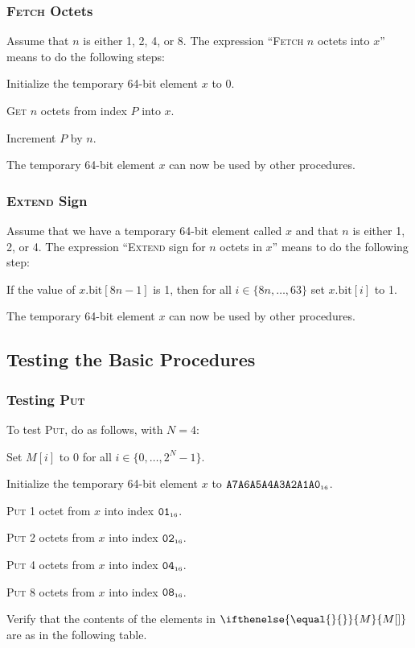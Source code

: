 \documentclass[a4paper,12pt]{article}
\newcommand{\num}[1]{\texttt{#1}}
\newcommand{\hex}[1]{\num{#1}_{\textup{\tiny 16}}}
\newcommand{\MEM}[1]{\ifthenelse{\equal{#1}{}}{M}{M[#1]}}
\newcommand{\PC}{P}
\newcommand{\bitno}[2]{#1.\mathrm{bit}[#2]}
\newcommand{\range}[2]{\{#1,\ldots,#2\}}
\newcommand{\proc}[1]{\textsc{#1}}
\begin{document}
\subsubsection{\proc{Fetch} Octets}

Assume that $n$ is either 1, 2, 4, or 8.
The expression ``\proc{Fetch} $n$ octets into $x$'' means to do the following steps:
\begin{stepnumbers}
\item Initialize the temporary 64-bit element $x$ to 0.
\item \proc{Get} $n$ octets from index $\PC$ into $x$.
\item Increment $\PC$ by $n$.
\end{stepnumbers}
The temporary 64-bit element $x$ can now be used by other procedures.

\subsubsection{\proc{Extend} Sign}

Assume that we have a temporary 64-bit element called $x$ and that $n$ is either 1, 2, or 4.
The expression ``\proc{Extend} sign for $n$ octets in $x$'' means to do the following step:
\begin{stepnumbers}
\item If the value of $\bitno{x}{8n-1}$ is 1, then for all $i \in \range{8n}{63}$ set $\bitno{x}{i}$ to 1.
\end{stepnumbers}
The temporary 64-bit element $x$ can now be used by other procedures.

\subsection{Testing the Basic Procedures}

\subsubsection{Testing \proc{Put}}

To test \proc{Put}, do as follows, with $N=4$:
\begin{stepnumbers}
\item Set $M[i]$ to 0 for all $i \in \range{0}{2^N-1}$.
\item Initialize the temporary 64-bit element $x$ to $\hex{A7A6A5A4A3A2A1A0}$.
\item \proc{Put} 1 octet  from $x$ into index $\hex{01}$.
\item \proc{Put} 2 octets from $x$ into index $\hex{02}$.
\item \proc{Put} 4 octets from $x$ into index $\hex{04}$.
\item \proc{Put} 8 octets from $x$ into index $\hex{08}$.
\item Verify that the contents of the elements in $\MEM{}$ are as in the following table.
\end{stepnumbers}
\end{document}
